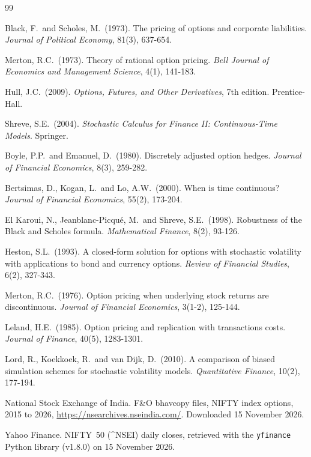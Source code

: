 \documentclass[11pt,a4paper]{article}
\begin{document}
\begin{thebibliography}{99}\scriptsize
\setlength{\itemsep}{0pt}\setlength{\parskip}{0pt}

 Black, F.\ and Scholes, M.\ (1973). The pricing of options and corporate liabilities. \emph{Journal of Political Economy}, 81(3), 637-654.

 Merton, R.C.\ (1973). Theory of rational option pricing. \emph{Bell Journal of Economics and Management Science}, 4(1), 141-183.

 Hull, J.C.\ (2009). \emph{Options, Futures, and Other Derivatives}, 7th edition. Prentice-Hall.

 Shreve, S.E.\ (2004). \emph{Stochastic Calculus for Finance II: Continuous-Time Models}. Springer.

 Boyle, P.P.\ and Emanuel, D.\ (1980). Discretely adjusted option hedges. \emph{Journal of Financial Economics}, 8(3), 259-282.

 Bertsimas, D., Kogan, L.\ and Lo, A.W.\ (2000). When is time continuous? \emph{Journal of Financial Economics}, 55(2), 173-204.

 El Karoui, N., Jeanblanc-Picqu\'e, M.\ and Shreve, S.E.\ (1998). Robustness of the Black and Scholes formula. \emph{Mathematical Finance}, 8(2), 93-126.

 Heston, S.L.\ (1993). A closed-form solution for options with stochastic volatility with applications to bond and currency options. \emph{Review of Financial Studies}, 6(2), 327-343.

 Merton, R.C.\ (1976). Option pricing when underlying stock returns are discontinuous. \emph{Journal of Financial Economics}, 3(1-2), 125-144.

 Leland, H.E.\ (1985). Option pricing and replication with transactions costs. \emph{Journal of Finance}, 40(5), 1283-1301.

 Lord, R., Koekkoek, R.\ and van Dijk, D.\ (2010). A comparison of biased simulation schemes for stochastic volatility models. \emph{Quantitative Finance}, 10(2), 177-194.

 National Stock Exchange of India. F\&O bhavcopy files, NIFTY index options, 2015 to 2026, \url{https://nsearchives.nseindia.com/}. Downloaded 15 November 2026.

 Yahoo Finance. NIFTY~50 (\^{}NSEI) daily closes, retrieved with the \texttt{yfinance} Python library (v1.8.0) on 15 November 2026.

\end{thebibliography}
\end{document}
